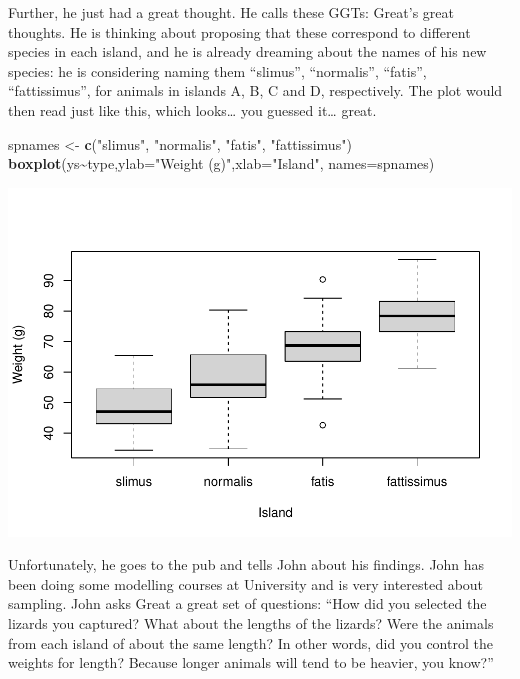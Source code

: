 \documentclass[
]{book}
\newenvironment{Shaded}{\begin{snugshade}}{\end{snugshade}}
\newcommand{\AttributeTok}[1]{\textcolor[rgb]{0.13,0.29,0.53}{#1}}
\newcommand{\FunctionTok}[1]{\textcolor[rgb]{0.13,0.29,0.53}{\textbf{#1}}}
\newcommand{\NormalTok}[1]{#1}
\newcommand{\OtherTok}[1]{\textcolor[rgb]{0.56,0.35,0.01}{#1}}
\newcommand{\SpecialCharTok}[1]{\textcolor[rgb]{0.81,0.36,0.00}{\textbf{#1}}}
\newcommand{\StringTok}[1]{\textcolor[rgb]{0.31,0.60,0.02}{#1}}
\begin{document}
Further, he just had a great thought. He calls these GGTs: Great's great thoughts. He is thinking about proposing that these correspond to different species in each island, and he is already dreaming about the names of his new species: he is considering naming them ``slimus'', ``normalis'', ``fatis'', ``fattissimus'', for animals in islands A, B, C and D, respectively. The plot would then read just like this, which looks\ldots{} you guessed it\ldots{} great.

\begin{Shaded}
\begin{Highlighting}[]
\NormalTok{spnames }\OtherTok{\textless{}{-}} \FunctionTok{c}\NormalTok{(}\StringTok{"slimus"}\NormalTok{, }\StringTok{"normalis"}\NormalTok{, }\StringTok{"fatis"}\NormalTok{, }\StringTok{"fattissimus"}\NormalTok{)}
\FunctionTok{boxplot}\NormalTok{(ys}\SpecialCharTok{\textasciitilde{}}\NormalTok{type,}\AttributeTok{ylab=}\StringTok{"Weight (g)"}\NormalTok{,}\AttributeTok{xlab=}\StringTok{"Island"}\NormalTok{,}
\AttributeTok{names=}\NormalTok{spnames)}
\end{Highlighting}
\end{Shaded}

\includegraphics{ECOMODbook_files/figure-latex/a10.5-1.pdf}

Unfortunately, he goes to the pub and tells John about his findings. John has been doing some modelling courses at University and is very interested about sampling. John asks Great a great set of questions: ``How did you selected the lizards you captured? What about the lengths of the lizards? Were the animals from each island of about the same length? In other words, did you control the weights for length? Because longer animals will tend to be heavier, you know?''
\end{document}
